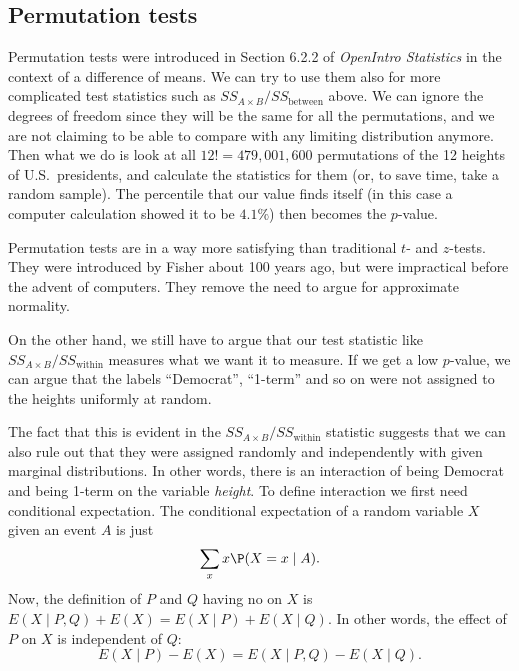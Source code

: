 \subsection{Permutation tests}%
Permutation tests were introduced in Section 6.2.2 of \emph{OpenIntro Statistics} in the context of a difference of means. We can try to use them also for more complicated test statistics such as $SS_{A\times B}/SS_{\text{between}}$ above. We can ignore the degrees of freedom since they will be the same for all the permutations, and we are not claiming to be able to compare with any limiting distribution anymore. Then what we do is look at all $12!=479,001,600$ permutations of the 12 heights of U.S.~presidents, and calculate the statistics for them (or, to save time, take a random sample). The percentile that our value finds itself (in this case a computer calculation showed it to be $4.1\%$) then becomes the $p$-value.

Permutation tests are in a way more satisfying than traditional $t$- and $z$-tests. They were introduced by Fisher about 100 years ago, but were impractical before the advent of computers. They remove the need to argue for approximate normality.

On the other hand, we still have to argue that our test statistic like $SS_{A\times B}/SS_{\text{within}}$ measures what we want it to measure. If we get a low $p$-value, we can argue that the labels ``Democrat'', ``1-term'' and so on were not assigned to the heights uniformly at random.

The fact that this is evident in the $SS_{A\times B}/SS_{\text{within}}$ statistic suggests that we can also rule out that they were assigned randomly and independently with given marginal distributions. In other words, there is an interaction of being Democrat and being 1-term on the variable \emph{height}. %
To define interaction we first need conditional expectation.
The conditional expectation of a random variable $X$ given an event $A$ is just
\[
	\sum_x x \P(X=x\mid A).
\]
Now, the definition of $P$ and $Q$ having no  on $X$ is $E(X\mid P,Q)+E(X)= E(X\mid P)+E(X\mid Q)$. In other words, the effect of $P$ on $X$ is independent of $Q$:
\[
	E(X\mid P)-E(X) = E(X\mid P,Q)-E(X\mid Q).
\]

